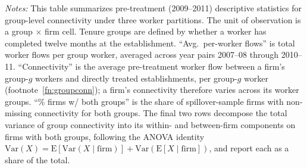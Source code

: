 \documentclass[11pt]{article}
\begin{document}
\begin{table}[H]
\begin{minipage}{\linewidth}
\textit{Notes:} This table summarizes pre-treatment (2009--2011) descriptive statistics for group-level connectivity under three worker partitions. The unit of observation is a group $\times$ firm cell. Tenure groups are defined by whether a worker has completed twelve months at the establishment. ``Avg.\ per-worker flows'' is total worker flows per group worker, averaged across year pairs 2007--08 through 2010--11. ``Connectivity'' is the average pre-treatment worker flow between a firm's group-$g$ workers and directly treated establishments, per group-$g$ worker (footnote~\ref{fn:groupconn}); a firm's connectivity therefore varies across its worker groups. ``\% firms w/ both groups'' is the share of spillover-sample firms with non-missing connectivity for both groups. The final two rows decompose the total variance of group connectivity into its within- and between-firm components on firms with both groups, following the ANOVA identity $\mathrm{Var}(X) = \mathrm{E}[\mathrm{Var}(X \mid \mathrm{firm})] + \mathrm{Var}(\mathrm{E}[X \mid \mathrm{firm}])$, and report each as a share of the total.
\end{minipage}
\end{table}
\end{document}
